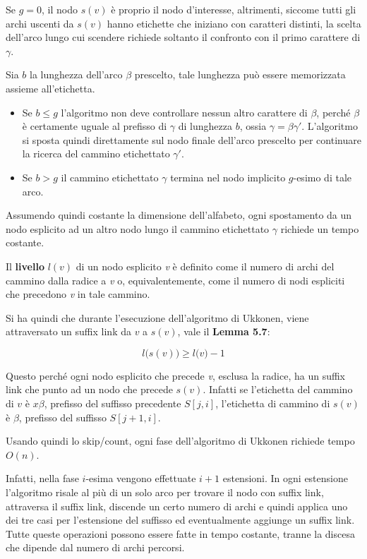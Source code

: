 Se $g = 0$, il nodo $s(v)$ è proprio il nodo d'interesse, altrimenti, siccome tutti gli archi uscenti da $s(v)$ hanno etichette che iniziano con caratteri distinti, la scelta dell'arco lungo cui scendere richiede soltanto il confronto con il primo carattere di $\gamma$.

Sia $b$ la lunghezza dell'arco $\beta$ prescelto, tale lunghezza può essere memorizzata assieme all'etichetta.

\begin{itemize}
\item Se $b \leq g$ l'algoritmo non deve controllare nessun altro carattere di $\beta$, perché $\beta$ è certamente uguale al prefisso di $\gamma$ di lunghezza $b$, ossia $\gamma = \beta\gamma'$. L'algoritmo si sposta quindi direttamente sul nodo finale dell'arco prescelto per continuare la ricerca del cammino etichettato $\gamma'$.
\item Se $b > g$ il cammino etichettato $\gamma$ termina nel nodo implicito $g$-esimo di tale arco.
\end{itemize}

Assumendo quindi costante la dimensione dell'alfabeto, ogni spostamento da un nodo esplicito ad un altro nodo lungo il cammino etichettato $\gamma$ richiede un tempo costante.

Il \textbf{livello} $l(v)$ di un nodo esplicito \textit{v} è definito come il numero di archi del cammino dalla radice a \textit{v} o, equivalentemente, come il numero di nodi espliciti che precedono \textit{v} in tale cammino.

Si ha quindi che durante l'esecuzione dell'algoritmo di Ukkonen, viene attraversato un suffix link da $v$ a $s(v)$, vale il \textbf{Lemma 5.7}:

$$
l\big(s(v)\big) \geq l\big(v\big) -1
$$

Questo perché ogni nodo esplicito che precede \textit{v}, esclusa la radice, ha un suffix link che punto ad un nodo che precede $s(v)$. Infatti se l'etichetta del cammino di $v$ è $x\beta$, prefisso del suffisso precedente $S[j,i]$, l'etichetta di cammino di $s(v)$ è $\beta$, prefisso del suffisso $S[j+1,i]$.

Usando quindi lo skip/count, ogni fase dell'algoritmo di Ukkonen richiede tempo $O(n)$.

Infatti, nella fase $i$-esima vengono effettuate $i+1$ estensioni. In ogni estensione l'algoritmo risale al più di un solo arco per trovare il nodo con suffix link, attraversa il suffix link, discende un certo numero di archi e quindi applica uno dei tre casi per l'estensione del suffisso ed eventualmente aggiunge un suffix link. Tutte queste operazioni possono essere fatte in tempo costante, tranne la discesa che dipende dal numero di archi percorsi.

